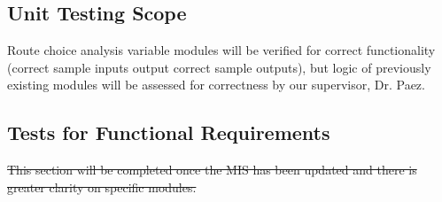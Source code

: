 \documentclass[12pt, titlepage]{article}
\begin{document}
\subsection{Unit Testing Scope}

Route choice analysis variable modules will be verified for correct functionality (correct sample inputs output correct sample outputs), but logic of previously existing modules will be assessed for correctness by our supervisor, Dr. Paez.

\subsection{Tests for Functional Requirements}

\sout{This section will be completed once the MIS has been updated and there is greater clarity on specific modules.}
\end{document}
